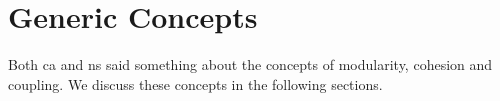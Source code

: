\section{Generic Concepts} \label{section_key_concepts}

Both \gls{ca} and \gls{ns} said something about the concepts of modularity, cohesion and
coupling. We discuss these concepts in the following sections. 



